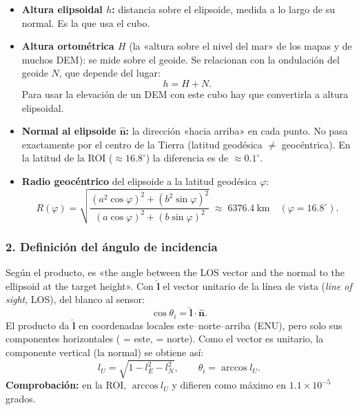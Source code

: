 \documentclass[11pt,a4paper]{article}
\begin{document}
\begin{itemize}
  \item \textbf{Altura elipsoidal $h$:} distancia sobre el elipsoide, medida a lo largo de su normal. Es la que usa el cubo.
  \item \textbf{Altura ortométrica $H$} (la «altura sobre el nivel del mar» de los mapas y de muchos DEM): se mide sobre el geoide. Se
        relacionan con la ondulación del geoide $N$, que depende del lugar:
        \begin{equation}
          h = H + N .
        \end{equation}
        Para usar la elevación de un DEM con este cubo hay que convertirla a altura elipsoidal.
  \item \textbf{Normal al elipsoide $\hat{\mathbf n}$:} la dirección «hacia arriba» en cada punto. No pasa exactamente por el centro de
        la Tierra (latitud geodésica $\neq$ geocéntrica). En la latitud de la ROI ($\approx 16.8^\circ$) la diferencia es de
        $\approx 0.1^\circ$.
  \item \textbf{Radio geocéntrico} del elipsoide a la latitud geodésica $\varphi$:
        \begin{equation}
          R(\varphi) = \sqrt{\frac{(a^2\cos\varphi)^2 + (b^2\sin\varphi)^2}{(a\cos\varphi)^2 + (b\sin\varphi)^2}}
          \;\approx\; 6376.4\ \text{km} \quad (\varphi = 16.8^\circ).
        \end{equation}
\end{itemize}

\subsubsection*{2. Definición del ángulo de incidencia}

Según el producto,  es «the angle between the LOS vector and the normal to the ellipsoid at the target height».
Con $\hat{\mathbf l}$ el vector unitario de la línea de vista (\emph{line of sight}, LOS), del blanco al sensor:
\begin{equation}
  \cos\theta_i = \hat{\mathbf l}\cdot\hat{\mathbf n}.
  \label{eq:incidencia}
\end{equation}
El producto da $\hat{\mathbf l}$ en coordenadas locales este--norte--arriba (ENU), pero solo sus componentes horizontales
( = este,  = norte). Como el vector es unitario, la componente vertical (la normal) se obtiene así:
\begin{equation}
  l_U = \sqrt{1 - l_E^2 - l_N^2}, \qquad \theta_i = \arccos l_U .
\end{equation}
\textbf{Comprobación:} en la ROI, $\arccos l_U$ y  difieren como máximo en $1.1\times10^{-5}$ grados.
\end{document}
